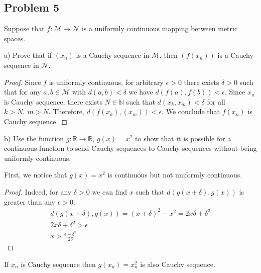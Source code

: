 \documentclass{article}
\newcommand{\R}{\mathbb{R}}
\newcommand{\N}{\mathbb{N}}
\begin{document}
\subsection*{Problem 5}

\begin{tcolorbox}
Suppose that $f : \mathcal{M} \to \mathcal{N}$ is a uniformly continuous mapping between metric spaces.

a) Prove that if $(x_n)$ is a Cauchy sequence in $\mathcal{M}$, then $(f (x_n))$ is a Cauchy sequence in $\mathcal{N}$.
\end{tcolorbox}

\begin{proof}

Since $f$ is uniformly continuous, for arbitrary $\epsilon>0$ there exists $\delta>0$ such that for any $a,b \in \mathcal{M}$ with $d(a,b)<\delta$ we have $d(f(a),f(b))<\epsilon$.
Since $x_n$ is Cauchy sequence, there exists $N\in\N$ such that $d(x_k, x_m) < \delta$ for all $k>N, \>m>N$.
Therefore, $d(f(x_k), (x_m)) < \epsilon$. We conclude that $f(x_n)$ is Cauchy sequence.

\end{proof}

\begin{tcolorbox}
b) Use the function $g : \R \to \R$, $g(x) = x^2$ to show that it is possible for a continuous function to send Cauchy sequences to Cauchy sequences without being uniformly continuous.
\end{tcolorbox}

First, we notice that $g(x)=x^2$ is continuous but not uniformly continuous. 

\begin{proof}

Indeed, for any $\delta>0$ we can find $x$ such that $d(g(x+\delta),g(x))$ is greater than any $\epsilon > 0$.
\begin{gather*}
    d(g(x+\delta),g(x)) = (x+\delta)^2 - x^2 = 2x\delta + \delta^2 \\
    2x\delta + \delta^2 > \epsilon \\
    x > \frac{\epsilon -\delta^2}{2\delta}    
\end{gather*}

\end{proof}

If $x_n$ is Cauchy sequence then $g(x_n)=x_n^2$ is also Cauchy sequence.
\end{document}
